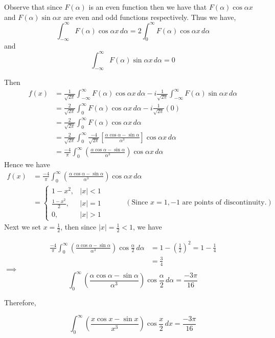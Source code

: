 \documentclass[12pt]{scrartcl}
\begin{document}
\begin{soln}
\begin{mdframed}[style=observebox]
	Observe that since $F(\alpha)$ is an even function then we have that $F(\alpha)\cos \alpha x$ and $F(\alpha)\sin \alpha x$ are even and odd functions respectively. Thus we have,
	\[
	\int_{-\infty}^{\infty} F(\alpha) \cos \alpha x \, d\alpha = 2\int_{0}^{\infty} F(\alpha) \cos \alpha x \, d\alpha
\]
and 
\[
	\int_{-\infty}^{\infty} F(\alpha) \sin \alpha x \, d\alpha = 0
\]
\end{mdframed}
Then 
\begin{align*}
	f(x) & = \frac{1}{\sqrt{2\pi}} \int_{-\infty}^{\infty} F(\alpha) \cos \alpha x \, d\alpha - i \frac{1}{\sqrt{2\pi}} \int_{-\infty}^{\infty} F(\alpha) \sin \alpha x \, d\alpha \\
		 & = \frac{2}{\sqrt{2\pi}} \int_{0}^{\infty} F(\alpha) \cos \alpha x \, d\alpha - i \frac{1}{\sqrt{2\pi}} (0) \\
		 & = \frac{2}{\sqrt{2\pi}} \int_{0}^{\infty} F(\alpha) \cos \alpha x \, d\alpha \\
		 & = \frac{2}{\sqrt{2\pi}} \int_{0}^{\infty} \frac{-4}{\sqrt{2\pi}}  \left[ \frac{\alpha \cos \alpha - \sin \alpha}{\alpha^3} \right] \cos \alpha x \, d\alpha \\
		 & = \frac{-4}{\pi} \int_{0}^{\infty} \left( \frac{\alpha \cos \alpha - \sin \alpha}{\alpha^3} \right) \cos \alpha x \, d\alpha
\end{align*}
Hence we have 
\begin{align*}
	f(x) & = \frac{-4}{\pi} \int_{0}^{\infty} \left( \frac{\alpha \cos \alpha - \sin \alpha}{\alpha^3} \right) \cos \alpha x \, d\alpha \\
		 & = \begin{cases}
																1-x^2, & |x| < 1 \\
																\frac{1-x^2}{2}, & |x|=1 \\
																0, & |x| > 1
\end{cases} \qquad \quad (\text{Since $x = 1,-1$ are points of discontinuity.})
\end{align*}
Next we set $x = \frac12$, then since $|x| = \frac12 < 1$, we have 

\begin{align*}
	\frac{-4}{\pi} \int_{0}^{\infty} \left( \frac{\alpha \cos \alpha - \sin \alpha}{\alpha^3} \right) \cos \frac{\alpha}{2} \, d\alpha  & = 1 - \left(\frac{1}{2}\right)^2 = 1 - \frac14 \\
 													& = \frac34
\end{align*}
$\implies$ 
\[
	\int_{0}^{\infty} \left( \frac{\alpha \cos \alpha - \sin \alpha}{\alpha^3} \right) \cos \frac{\alpha}{2} \, d\alpha = \frac{-3\pi}{16}
\]

Therefore,
\begin{mdframed}[style=mybox]
	\[
	\int_{0}^{\infty} \left( \frac{x \cos x - \sin x}{x^3} \right) \cos \frac{x}{2} \, dx = \frac{-3\pi}{16}
\]
\end{mdframed}

\end{soln}


\end{document}
